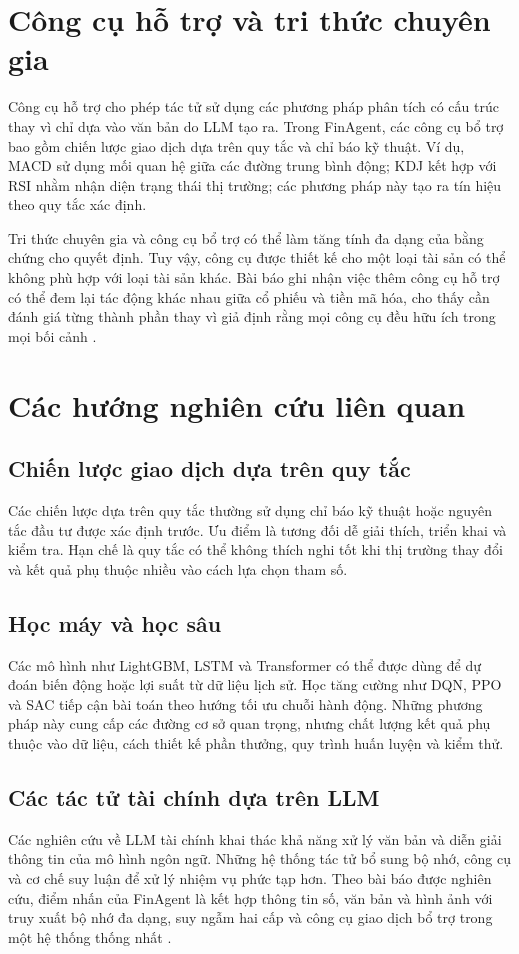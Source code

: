 \section{Công cụ hỗ trợ và tri thức chuyên gia}

Công cụ hỗ trợ cho phép tác tử sử dụng các phương pháp phân tích có cấu trúc thay vì chỉ dựa vào văn bản do LLM tạo ra. Trong FinAgent, các công cụ bổ trợ bao gồm chiến lược giao dịch dựa trên quy tắc và chỉ báo kỹ thuật. Ví dụ, MACD sử dụng mối quan hệ giữa các đường trung bình động; KDJ kết hợp với RSI nhằm nhận diện trạng thái thị trường; các phương pháp này tạo ra tín hiệu theo quy tắc xác định.

Tri thức chuyên gia và công cụ bổ trợ có thể làm tăng tính đa dạng của bằng chứng cho quyết định. Tuy vậy, công cụ được thiết kế cho một loại tài sản có thể không phù hợp với loại tài sản khác. Bài báo ghi nhận việc thêm công cụ hỗ trợ có thể đem lại tác động khác nhau giữa cổ phiếu và tiền mã hóa, cho thấy cần đánh giá từng thành phần thay vì giả định rằng mọi công cụ đều hữu ích trong mọi bối cảnh \cite{zhang2024finagent}.

\section{Các hướng nghiên cứu liên quan}

\subsection{Chiến lược giao dịch dựa trên quy tắc}
Các chiến lược dựa trên quy tắc thường sử dụng chỉ báo kỹ thuật hoặc nguyên tắc đầu tư được xác định trước. Ưu điểm là tương đối dễ giải thích, triển khai và kiểm tra. Hạn chế là quy tắc có thể không thích nghi tốt khi thị trường thay đổi và kết quả phụ thuộc nhiều vào cách lựa chọn tham số.

\subsection{Học máy và học sâu}
Các mô hình như LightGBM, LSTM và Transformer có thể được dùng để dự đoán biến động hoặc lợi suất từ dữ liệu lịch sử. Học tăng cường như DQN, PPO và SAC tiếp cận bài toán theo hướng tối ưu chuỗi hành động. Những phương pháp này cung cấp các đường cơ sở quan trọng, nhưng chất lượng kết quả phụ thuộc vào dữ liệu, cách thiết kế phần thưởng, quy trình huấn luyện và kiểm thử.

\subsection{Các tác tử tài chính dựa trên LLM}
Các nghiên cứu về LLM tài chính khai thác khả năng xử lý văn bản và diễn giải thông tin của mô hình ngôn ngữ. Những hệ thống tác tử bổ sung bộ nhớ, công cụ và cơ chế suy luận để xử lý nhiệm vụ phức tạp hơn. Theo bài báo được nghiên cứu, điểm nhấn của FinAgent là kết hợp thông tin số, văn bản và hình ảnh với truy xuất bộ nhớ đa dạng, suy ngẫm hai cấp và công cụ giao dịch bổ trợ trong một hệ thống thống nhất \cite{zhang2024finagent}.

